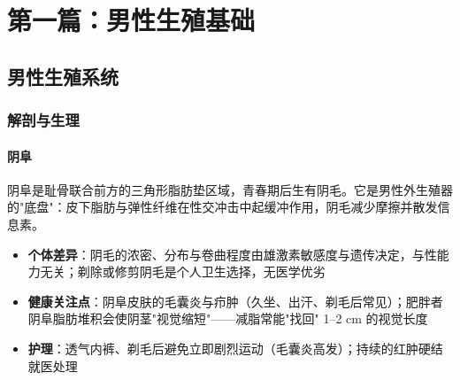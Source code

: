 %
%

\newif\ifskipmaleframework
\skipmaleframeworktrue   %

\ifskipmaleframework
\else

\part{第一篇：男性生殖基础}

\chapter{男性生殖系统}

\section{解剖与生理}

\subsection{阴阜}


阴阜是耻骨联合前方的三角形脂肪垫区域，青春期后生有阴毛。它是男性外生殖器的"底盘"：皮下脂肪与弹性纤维在性交冲击中起缓冲作用，阴毛减少摩擦并散发信息素。

\begin{itemize}
	\item \textbf{个体差异}：阴毛的浓密、分布与卷曲程度由雄激素敏感度与遗传决定，与性能力无关；剃除或修剪阴毛是个人卫生选择，无医学优劣
	\item \textbf{健康关注点}：阴阜皮肤的毛囊炎与疖肿（久坐、出汗、剃毛后常见）；肥胖者阴阜脂肪堆积会使阴茎"视觉缩短"——减脂常能"找回" 1--2 cm 的视觉长度
	\item \textbf{护理}：透气内裤、剃毛后避免立即剧烈运动（毛囊炎高发）；持续的红肿硬结就医处理
\end{itemize}


